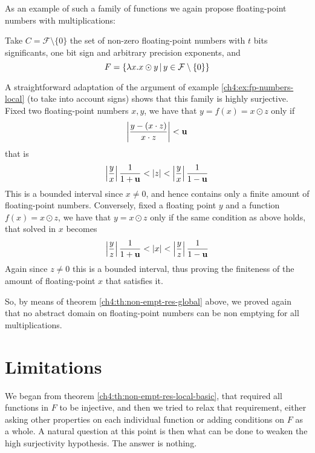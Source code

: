 As an example of such a family of functions we again propose floating-point numbers with multiplications:
\begin{example}\label{ch4:ex:fp-numbers-global}
	Take $C = \mathcal{F} \setminus \{ 0 \}$ the set of non-zero floating-point numbers with $t$ bits significants, one bit sign and arbitrary precision exponents, and
	\[
	F = \{ \lambda x . x \odot y \,\vert\, y \in \mathcal{F} \setminus \{ 0 \} \}
	\]

	A straightforward adaptation of the argument of example \ref{ch4:ex:fp-numbers-local} (to take into account signs) shows that this family is highly surjective.
	Fixed two floating-point numbers $x, y$, we have that $y = f(x) = x \odot z$ only if
	\[
	\left\lvert \frac{y - (x \cdot z)}{x \cdot z} \right\rvert < \textbf{u}
	\]
	that is
	\[
	\left\lvert\frac{y}{x}\right\rvert \frac{1}{1+\textbf{u}} < \lvert z\rvert < \left\lvert\frac{y}{x}\right\rvert \frac{1}{1-\textbf{u}}
	\]
	This is a bounded interval since $x \neq 0$, and hence contains only a finite amount of floating-point numbers.
	Conversely, fixed a floating point $y$ and a function $f(x) = x \odot z$, we have that $y = x \odot z$ only if the same condition as above holds, that solved in $x$ becomes
	\[
	\left\lvert\frac{y}{z}\right\rvert \frac{1}{1+\textbf{u}} < \lvert x\rvert < \left\lvert\frac{y}{z}\right\rvert \frac{1}{1-\textbf{u}}
	\]
	Again since $z \neq 0$ this is a bounded interval, thus proving the finiteness of the amount of floating-point $x$ that satisfies it.

	So, by means of theorem \ref{ch4:th:non-empt-res-global} above, we proved again that no abstract domain on floating-point numbers can be non emptying for all multiplications.
\end{example}

\section{Limitations}
We began from theorem \ref{ch4:th:non-empt-res-local-basic}, that required all functions in $F$ to be injective, and then we tried to relax that requirement, either asking other properties on each individual function or adding conditions on $F$ as a whole.
A natural question at this point is then what can be done to weaken the high surjectivity hypothesis. The answer is nothing.

